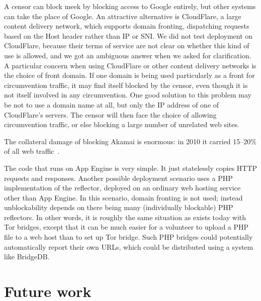 \documentclass[conference]{IEEEtran}
\begin{document}
A censor can block meek by blocking access to Google entirely,
but other systems can take the place of Google.
An attractive alternative is CloudFlare, a large content delivery network,
which supports domain fronting, dispatching requests based on the Host header
rather than IP or SNI.
We did not test deployment on CloudFlare,
because their terms of service are not clear on whether this kind of use is allowed,
and we got an ambiguous answer when we asked for clarification.
A particular concern when using CloudFlare or other content delivery networks is the choice of front domain.
If one domain is being used particularly as a front for circumvention traffic,
it may find itself blocked by the censor, even though it is not itself
involved in any circumvention.
One good solution to this problem may be not to use a domain name at all,
but only the IP address of one of CloudFlare's servers.
The censor will then face the choice of allowing circumvention traffic,
or else blocking a large number of unrelated web sites.


The collateral damage of blocking Akamai is enormous: in 2010 it carried 15--20\% of all web traffic~\cite{akamai}.

The code that runs on App Engine is very simple.
It just statelessly copies HTTP requests and responses.
Another possible deployment scenario uses a PHP implementation of the reflector,
deployed on an ordinary web hosting service other than App Engine.
In this scenario, domain fronting is not used;
instead unblockability depends on there being many (individually blockable) PHP reflectors.
In other words, it is roughly the same situation as exists today with Tor bridges,
except that it can be much easier for a volunteer to upload a PHP file to a web host
than to set up Tor bridge.
Such PHP bridges could potentially automatically report their own URLs,
which could be distributed using a system like BridgeDB.


\section{Future work}
\label{sec:futurework}
\end{document}
